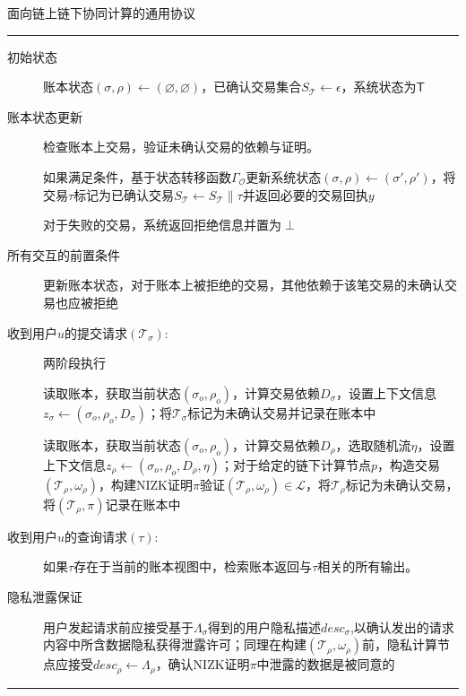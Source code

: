 \begin{center}
    面向链上链下协同计算的通用协议
\end{center}
\noindent\hrule
\begin{description}
    \item[初始状态] 账本状态$(\sigma, \rho) \leftarrow (\varnothing, \varnothing)$，已确认交易集合$S_\mathcal{T} \leftarrow \epsilon$，系统状态为$\mathsf{T}$
    
    \item[账本状态更新] 检查账本上交易，验证未确认交易的依赖与证明。
    
    如果满足条件，基于状态转移函数$\Gamma_{\mathcal{O}}$更新系统状态$(\sigma, \rho) \leftarrow (\sigma', \rho')$，将交易$\tau$标记为已确认交易$S_\mathcal{T} \leftarrow S_\mathcal{T}\parallel\tau$并返回必要的交易回执$y$

    对于失败的交易，系统返回拒绝信息并置为$\perp$

    \item[所有交互的前置条件] 更新账本状态，对于账本上被拒绝的交易，其他依赖于该笔交易的未确认交易也应被拒绝

    \item[收到用户$u$的提交请求$(\mathcal{T}_\sigma)$:] 两阶段执行
    
    \subitem [stage 1] 读取账本，获取当前状态$(\sigma_o, \rho_o)$，计算交易依赖$D_\sigma$，设置上下文信息$z_\sigma \leftarrow (\sigma_o, \rho_o, D_\sigma)$；将$\mathcal{T}_\sigma$标记为未确认交易并记录在账本中
    
    \subitem [stage 2] 读取账本，获取当前状态$(\sigma_o, \rho_o)$，计算交易依赖$D_\rho$，选取随机流$\eta$，设置上下文信息$z_\rho \leftarrow (\sigma_o, \rho_o, D_\rho, \eta)$；对于给定的链下计算节点$\mathit{p}$，构造交易$(\mathcal{T}_\rho, \omega_\rho)$，构建NIZK证明$\pi$验证$(\mathcal{T}_\rho, \omega_\rho) \in \mathcal{L}$，将$\mathcal{T}_\rho$标记为未确认交易，将$(\mathcal{T}_\rho, \pi)$记录在账本中

    \item[收到用户$u$的查询请求$(\tau)$:] 如果$\tau$存在于当前的账本视图中，检索账本返回与$\tau$相关的所有输出。
    
    \item[隐私泄露保证] 用户发起请求前应接受基于$\Lambda_\sigma$得到的用户隐私描述$desc_\sigma$,以确认发出的请求内容中所含数据隐私获得泄露许可；同理在构建$(\mathcal{T}_\rho, \omega_\rho)$前，隐私计算节点应接受$desc_\rho \leftarrow \Lambda_\rho$，确认NIZK证明$\pi$中泄露的数据是被同意的
\end{description}
\noindent\hrule

